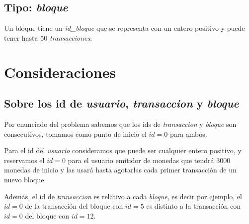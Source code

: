 \documentclass[10pt,a4paper]{article}
\begin{document}
    \subsection{Tipo: \textit{bloque}}
    Un bloque tiene un \textit{id\_bloque} que se representa con un entero positivo y puede tener hasta 50 \textit{transacciones}:

    \vspace{0.3cm}
    \noindent
    \vspace{0.1cm}

    \section{Consideraciones}
    \subsection{Sobre los id de \textit{usuario}, \textit{transaccion} y \textit{bloque}}
    Por enunciado del problema sabemos que los ids de \textit{transaccion} y \textit{bloque} son consecutivos, tomamos como punto de inicio el $id = 0$ para ambos. \par
    Para el id del \textit{usuario} consideramos que puede ser cualquier entero positivo, y reservamos el $id = 0$ para el usuario emitidor de monedas que tendrá 3000 monedas de inicio y las usará hasta agotarlas cada primer transacción de un nuevo bloque. \par
    Además, el id de \textit{transaccion} es relativo a cada \textit{bloque}, es decir por ejemplo, el $id = 0$ de la transacción del bloque con $id = 5$ es distinto a la transacción con $id = 0$ del bloque con $id = 12$.

    \newpage
\end{document}
